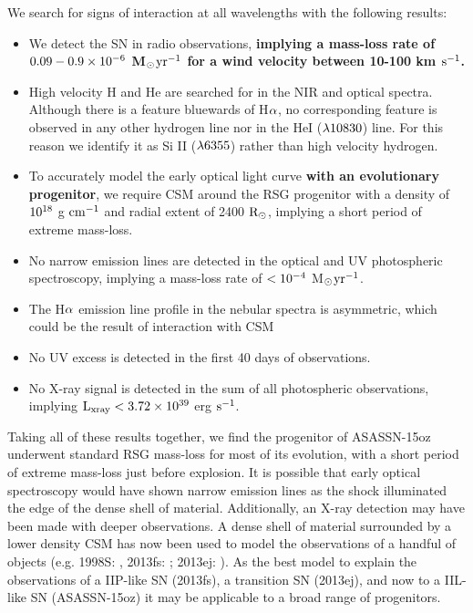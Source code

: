 \documentclass[a4paper,fleqn,usenatbib]{mnras}
\newcommand{\msunperiod}{M$\rm{_{\odot}}$}
\begin{document}
We search for signs of interaction at all wavelengths with the following results:
\begin{itemize}
\item We detect the SN in radio observations,\textbf{ implying a mass-loss rate of $\rm{0.09-0.9\times10^{-6}}$ \msunperiod $\rm{yr^{-1}}$ for a wind velocity between 10-100 km $\rm{s^{-1}}$.}
\item High velocity H and He are searched for in the NIR and optical spectra. 
Although there is a feature bluewards of H$\rm{\alpha}$, no corresponding feature is observed in any other hydrogen line nor in the HeI ($\rm{\lambda 10830}$) line. 
For this reason we identify it as Si II ($\rm{\lambda 6355}$) rather than high velocity hydrogen.
\item To accurately model the early optical light curve \textbf{with an evolutionary progenitor}, we require CSM around the RSG progenitor with a density of $\rm{10^{18}}$ g $\rm{cm^{-1}}$ and radial extent of 2400 $\rm{R_{\odot}}$, implying a short period of extreme mass-loss.
\item No narrow emission lines are detected in the optical and UV photospheric spectroscopy, implying a mass-loss rate of $\rm{< 10^{-4}}$ \msunperiod $\rm{yr^{-1}}$.
\item The H$\rm{\alpha}$ emission line profile in the nebular spectra is asymmetric, which could be the result of interaction with CSM
\item No UV excess is detected in the first 40 days of observations.
\item No X-ray signal is detected in the sum of all photospheric observations, implying $\rm{L_{xray}<3.72\times10^{39}}$ erg $\rm{s^{-1}}$.
\end{itemize}
Taking all of these results together, we find the progenitor of ASASSN-15oz underwent standard RSG mass-loss for most of its evolution, with a short period of extreme mass-loss just before explosion. 
It is possible that early optical spectroscopy would have shown narrow emission lines as the shock illuminated the edge of the dense shell of material.
Additionally, an X-ray detection may have been made with deeper observations. 
A dense shell of material surrounded by a lower density CSM has now been used to model the observations of a handful of objects (e.g. 1998S: \citealt{2001chugai}, 2013fs: \citealt{2017yaron}; 2013ej: \citealt{2018morozova2}).
As the best model to explain the observations of a IIP-like SN (2013fs), a transition SN (2013ej), and now to a IIL-like SN (ASASSN-15oz) it may be applicable to a broad range of progenitors.
\end{document}
